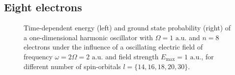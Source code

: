 \vfill
\pagebreak

\subsection*{Eight electrons}

\begin{figure}[!h]
    \centering
    \caption{Time-dependent energy (left) and ground state probability (right)
        of a one-dimensional harmonic oscillator with $\Omega=1 \text{ a.u.}$
        and $n=8$ electrons under the influence of a oscillating electric field 
        of frequency $\omega = 2 \Omega = 2 \text{ a.u.}$ and field strength
        $E_\text{max}=1 \text{ a.u.}$,
        for different number of spin-orbitals $l=\{14,16,18,20,30\}$.
    }
    \label{fig:1d_n8_qd}
\end{figure}

